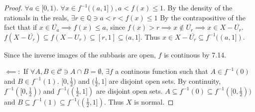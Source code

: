 \documentclass{article}
\newcommand*{\subeq}{\subseteq}
\newcommand*{\empset}{\emptyset}
\newcommand{\Q}{\mathbb{Q}}
\begin{document}
\begin{proof}
    $\forall a \in [0, 1)$. $\forall x \in f^{-1}((a, 1]), a < f(x) \leq 1$. By the density of the rationals in the reals, $\exists r \in \Q \ni a < r < f(x) \leq 1$  By the contrapositive of the fact that if $x \in \overline{U_a} \implies f(x) \leq a$, since $f(x) > r \implies x \not \in \overline{U_r} \implies x \in X - \overline{U_r}$. $f(X - \overline{U_r}) \subeq f(X - U_r) \subeq [r, 1] \subeq (a, 1] $. Thus $x \in X - \overline{U_r} \subeq f^{-1}((a, 1])$. 
    
    Since the inverse images of the subbasis are open, $f$ is continous by 7.14.  
    
    

    $\impliedby:$ If $\forall A, B \in \mathcal{C} \ni A \cap B = \empset$, $\exists f $ a continous function such that $A \in f^{-1}(0)$ and $B \in f^{-1}(1)$. $[0, \frac{1}{2})$ and $(\frac{1}{2}, 1]$ are disjoint open sets. By continuity, $f^{-1}([0, \frac{1}{2}))$ and $f^{-1}((\frac{1}{2}, 1])$ are disjoint open sets. $A \subeq f^{-1}(0) \subeq f^{-1}([0, \frac{1}{2}))$ and $B \subeq f^{-1}(1) \subeq f^{-1}((\frac{1}{2}, 1])$. Thus $X$ is normal.       
\end{proof}
\end{document}
